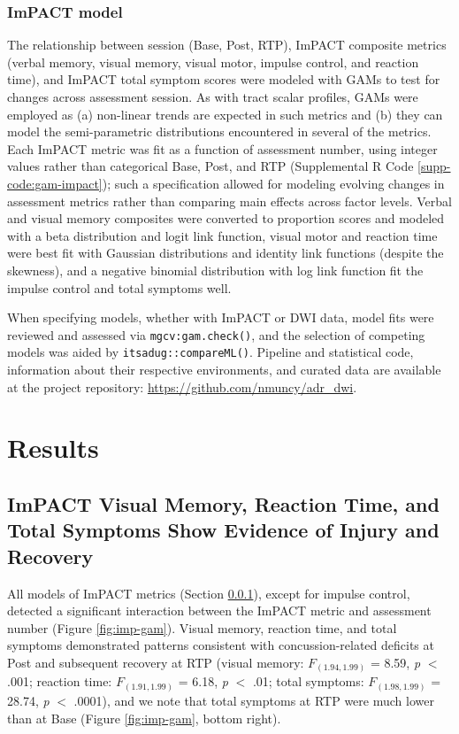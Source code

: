 \documentclass[12pt]{article}
\begin{document}
\subsubsection{ImPACT model}
\label{sssec:meth-gam-impact}
The relationship between session (Base, Post, RTP), ImPACT composite metrics (verbal memory, visual memory, visual motor, impulse control, and reaction time), and ImPACT total symptom scores were modeled with GAMs to test for changes across assessment session. As with tract scalar profiles, GAMs were employed as (a) non-linear trends are expected in such metrics and (b) they can model the semi-parametric distributions encountered in several of the metrics. Each ImPACT metric was fit as a function of assessment number, using integer values rather than categorical Base, Post, and RTP (Supplemental R Code \ref{supp-code:gam-impact}); such a specification allowed for modeling evolving changes in assessment metrics rather than comparing main effects across factor levels. Verbal and visual memory composites were converted to proportion scores and modeled with a beta distribution and logit link function, visual motor and reaction time were best fit with Gaussian distributions and identity link functions (despite the skewness), and a negative binomial distribution with log link function fit the impulse control and total symptoms well.

When specifying models, whether with ImPACT or DWI data, model fits were reviewed and assessed via \lstinline{mgcv:gam.check()}, and the selection of competing models was aided by \lstinline{itsadug::compareML()}. Pipeline and statistical code, information about their respective environments, and curated data are available at the project repository: \url{https://github.com/nmuncy/adr_dwi}.


\section{Results}
\label{sec:res}

\subsection{ImPACT Visual Memory, Reaction Time, and Total Symptoms Show Evidence of Injury and Recovery}
\label{ssec:res-imp}
All models of ImPACT metrics (Section \ref{sssec:meth-gam-impact}), except for impulse control, detected a significant interaction between the ImPACT metric and assessment number (Figure \ref{fig:imp-gam}). Visual memory, reaction time, and total symptoms demonstrated patterns consistent with concussion-related deficits at Post and subsequent recovery at RTP (visual memory: $F_{(1.94, 1.99)}$ = 8.59, \textit{p} $<$ .001; reaction time: $F_{(1.91, 1.99)}$ = 6.18, \textit{p} $<$ .01; total symptoms: $F_{(1.98, 1.99)}$ = 28.74, \textit{p} $<$ .0001), and we note that total symptoms at RTP were much lower than at Base (Figure \ref{fig:imp-gam}, bottom right).
\end{document}
